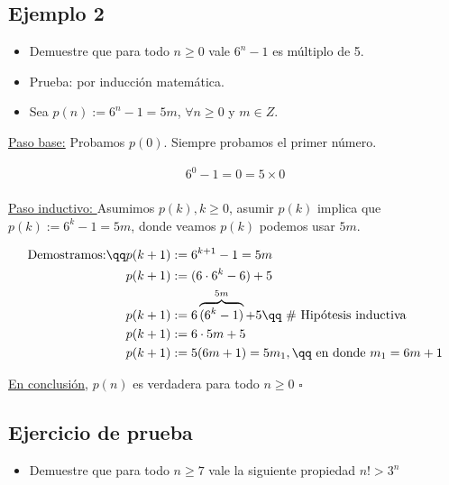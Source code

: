 \subsection{Ejemplo 2}
\begin{itemize}
    \item Demuestre que para todo $n\geq 0$ vale $6^n-1$ es múltiplo de 5. 
    \item Prueba: por inducción matemática. 
    \item Sea $p(n):=6^n-1=5m$, $\forall n \geq 0$ y $m \in Z$.
\end{itemize}

\underline{Paso base:} Probamos $p(0)$. Siempre probamos el primer número.
\begin{center}
   \begin{align*}
       6^0-1 = 0 = 5\times 0 \\ 
   \end{align*}
\end{center} 

\underline{Paso inductivo: } Asumimos $p(k), k \geq 0$, asumir $p(k)$ implica que $p(k):=6^k-1=5m$, donde veamos $p(k)$ podemos usar $5m$.

\begin{center}
   \begin{align*}
    \text{ Demostramos:}\qq & p(k+1):=6^{k+1}-1=5m \\ 
    & p(k+1):= (6\cdot 6^k -6)+5 \\ 
    & p(k+1):= 6\overbrace{(6^k-1)}^{5m}+5 \qq  \text{ \# Hipótesis inductiva } \\ 
    & p(k+1):= 6\cdot 5m + 5 \\ 
    & p(k+1):= 5(6m+1) = 5m_1, \qq \text{ en donde $m_1=6m+1$ } \\ 
   \end{align*}
\end{center}

\underline{En conclusión}, $p(n)$ es verdadera para todo $n\geq 0$ $\square$


\subsection{Ejercicio de prueba}
\begin{itemize}
    \item Demuestre que para todo $n\geq 7$ vale la siguiente propiedad $n!>3^n$ 
\end{itemize}

